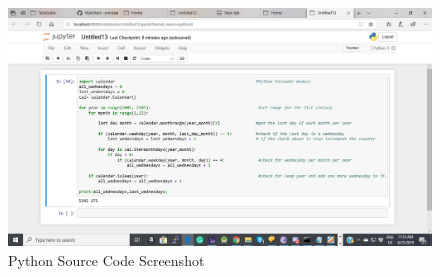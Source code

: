 \documentclass{article}
\begin{document}
\begin{figure}[H]
	\centering
	\includegraphics[width=1.2\linewidth, height=0.6\textheight]{pythonCode2}
	\caption{Python Source Code Screenshot}
	\label{fig:pythoncode}
\end{figure}
\end{document}
